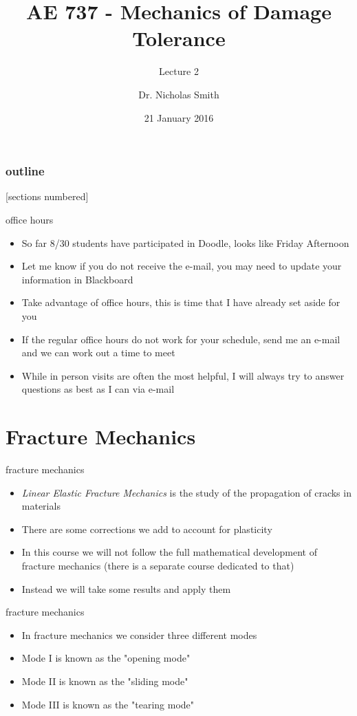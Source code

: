 \documentclass[10pt]{beamer}
\title{AE 737 - Mechanics of Damage Tolerance}
\subtitle{Lecture 2}
\date{21 January 2016}
\author{Dr. Nicholas Smith}
\institute{Wichita State University, Department of Aerospace Engineering}
\begin{document}
\maketitle

\begin{frame}
  \frametitle{outline}
  [sections numbered]
  \tableofcontents[hideallsubsections]
\end{frame}

\begin{frame}{office hours}
  \begin{itemize}
  \item So far 8/30 students have participated in Doodle, looks like Friday Afternoon
  \item Let me know if you do not receive the e-mail, you may need to update your information in Blackboard
  \item Take advantage of office hours, this is time that I have already set aside for you
  \item If the regular office hours do not work for your schedule, send me an e-mail and we can work out a time to meet
  \item While in person visits are often the most helpful, I will always try to answer questions as best as I can via e-mail
  \end{itemize}
\end{frame}

\section{Fracture Mechanics}

\begin{frame}{fracture mechanics}
	\begin{itemize}
		\item \emph{Linear Elastic Fracture Mechanics} is the study of the propagation of cracks in materials
		\item There are some corrections we add to account for plasticity
		\item In this course we will not follow the full mathematical development of fracture mechanics (there is a separate course dedicated to that)
		\item Instead we will take some results and apply them
	\end{itemize}
\end{frame}

\begin{frame}{fracture mechanics}
	\begin{itemize}
		\item In fracture mechanics we consider three different modes
		\item Mode I is known as the "opening mode"
		\item Mode II is known as the "sliding mode"
		\item Mode III is known as the "tearing mode"
	\end{itemize}
\end{frame}
\end{document}
